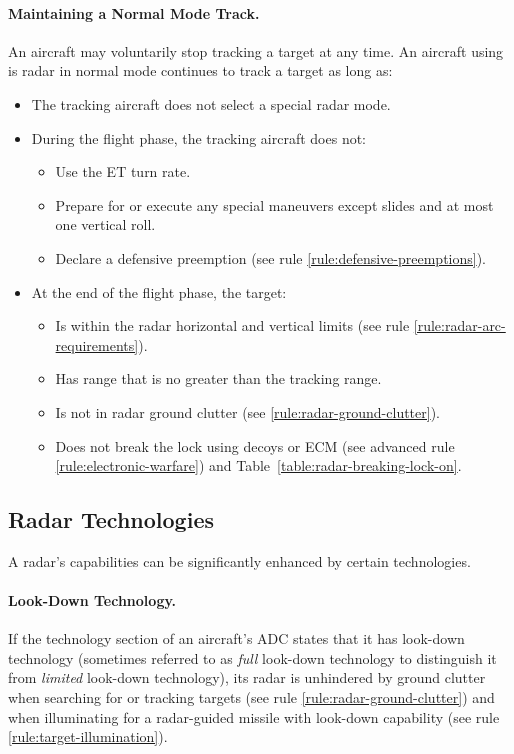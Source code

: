 {\paragraph{Maintaining a Normal Mode Track.} An aircraft may voluntarily stop tracking a target at any time.
An aircraft using is radar in normal mode continues to track a target as long as:
\begin{itemize}
\item The tracking aircraft does not select a special radar mode.
\item During the flight phase, the tracking aircraft does not:
\begin{itemize}
\item Use the ET turn rate.
\item Prepare for or execute any special maneuvers except slides and at most one vertical roll.
\item Declare a defensive preemption (see rule \ref{rule:defensive-preemptions}).
\end{itemize}
\item At the end of the flight phase, the target:
\begin{itemize}
\item Is within the radar horizontal and vertical limits (see rule \ref{rule:radar-arc-requirements}).
\item Has range that is no greater than the tracking range.
\item Is not in radar ground clutter (see  \ref{rule:radar-ground-clutter}).
\item Does not break the lock using decoys or ECM (see advanced rule \ref{rule:electronic-warfare}) and Table~\ref{table:radar-breaking-lock-on}. 
\end{itemize}
\end{itemize}

\begin{advancedrules}

\section{Radar Technologies}
\label{rule:radar-technology}

A radar's capabilities can be significantly enhanced by certain technologies.

\paragraph{Look-Down Technology.} \label{rule:look-down-technology} \label{rule:look-down-missiles}
If the technology section of an aircraft’s ADC states that it has look-down technology (sometimes referred to as \emph{full} look-down technology to distinguish it from \emph{limited} look-down technology), its radar is unhindered by ground clutter when searching for or tracking targets (see rule \ref{rule:radar-ground-clutter}) and when illuminating for a radar-guided missile with look-down capability (see rule \ref{rule:target-illumination}).


\end{advancedrules}}
